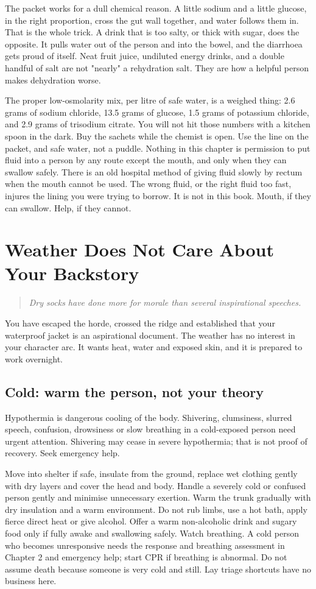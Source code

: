 \documentclass[10pt,openright]{book}
\begin{document}
The packet works for a dull chemical reason. A little sodium and a little glucose, in the right proportion, cross the gut wall together, and water follows them in. That is the whole trick. A drink that is too salty, or thick with sugar, does the opposite. It pulls water out of the person and into the bowel, and the diarrhoea gets proud of itself. Neat fruit juice, undiluted energy drinks, and a double handful of salt are not "nearly" a rehydration salt. They are how a helpful person makes dehydration worse.

The proper low-osmolarity mix, per litre of safe water, is a weighed thing: 2.6 grams of sodium chloride, 13.5 grams of glucose, 1.5 grams of potassium chloride, and 2.9 grams of trisodium citrate. You will not hit those numbers with a kitchen spoon in the dark. Buy the sachets while the chemist is open. Use the line on the packet, and safe water, not a puddle. Nothing in this chapter is permission to put fluid into a person by any route except the mouth, and only when they can swallow safely. There is an old hospital method of giving fluid slowly by rectum when the mouth cannot be used. The wrong fluid, or the right fluid too fast, injures the lining you were trying to borrow. It is not in this book. Mouth, if they can swallow. Help, if they cannot.

\chapter{Weather Does Not Care About Your Backstory}
\begin{quote}\emph{Dry socks have done more for morale than several inspirational speeches.}\end{quote}
You have escaped the horde, crossed the ridge and established that your waterproof jacket is an aspirational document. The weather has no interest in your character arc. It wants heat, water and exposed skin, and it is prepared to work overnight.

\section*{Cold: warm the person, not your theory}
Hypothermia is dangerous cooling of the body. Shivering, clumsiness, slurred speech, confusion, drowsiness or slow breathing in a cold-exposed person need urgent attention. Shivering may cease in severe hypothermia; that is not proof of recovery. Seek emergency help.

Move into shelter if safe, insulate from the ground, replace wet clothing gently with dry layers and cover the head and body. Handle a severely cold or confused person gently and minimise unnecessary exertion. Warm the trunk gradually with dry insulation and a warm environment. Do not rub limbs, use a hot bath, apply fierce direct heat or give alcohol. Offer a warm non-alcoholic drink and sugary food only if fully awake and swallowing safely. Watch breathing. A cold person who becomes unresponsive needs the response and breathing assessment in Chapter 2 and emergency help; start CPR if breathing is abnormal. Do not assume death because someone is very cold and still. Lay triage shortcuts have no business here.
\end{document}
